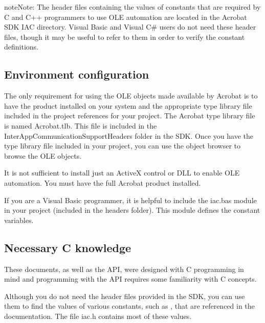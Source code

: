 \documentclass[letterpaper,12pt,english,openany,oneside]{sphinxmanual}
\begin{document}
\begin{sphinxadmonition}{note}{Note:}
The header files containing the values of constants that are required by C and C++ programmers to use OLE automation are located in the Acrobat SDK IAC directory. Visual Basic and Visual C\# users do not need these header files, though it may be useful to refer to them in order to verify the constant definitions.
\end{sphinxadmonition}


\subsection{Environment configuration}
\label{\detokenize{IAC_DevApp_OLE_Support:environment-configuration}}
The only requirement for using the OLE objects made available by Acrobat is to have the product installed on your system and the appropriate type library file included in the project references for your project. The Acrobat type library file is named Acrobat.tlb. This file is included in the InterAppCommunicationSupportHeaders folder in the SDK. Once you have the type library file included in your project, you can use the object browser to browse the OLE objects.

It is not sufficient to install just an ActiveX control or DLL to enable OLE automation. You must have the full Acrobat product installed.

If you are a Visual Basic programmer, it is helpful to include the iac.bas module in your project (included in the headers folder). This module defines the constant variables.


\subsection{Necessary C knowledge}
\label{\detokenize{IAC_DevApp_OLE_Support:necessary-c-knowledge}}
These documents, as well as the API, were designed with C programming in mind and programming with the API requires some familiarity with C concepts.

Although you do not need the header files provided in the SDK, you can use them to find the values of various constants, such as , that are referenced in the documentation. The file iac.h contains most of these values.
\end{document}
